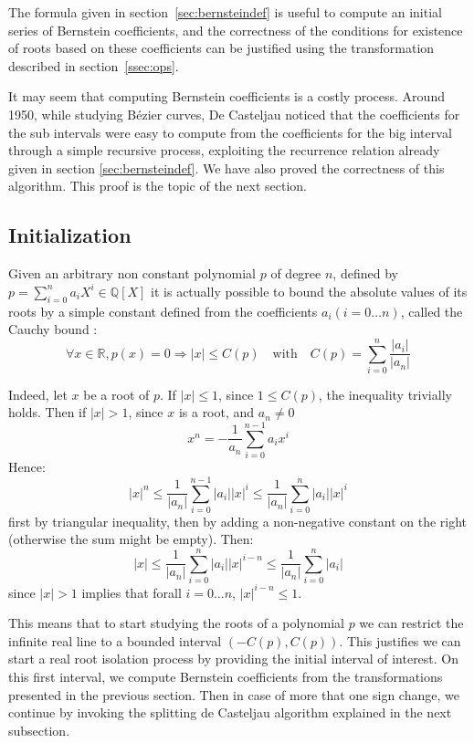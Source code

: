 \documentclass{mscs}
\begin{document}
The formula given in section~\ref{sec:bernsteindef} is useful to compute an
initial series of Bernstein coefficients, and the correctness of the
conditions for existence of roots based on these coefficients can be
justified using the transformation described in
section~\ref{ssec:ops}.

It may seem that computing Bernstein coefficients is a costly process.
Around 1950, while studying B\'ezier curves, De Casteljau noticed that
the coefficients for the sub intervals
were easy to compute from the coefficients for the big interval
through a simple recursive process, exploiting the recurrence relation
already given in section \ref{sec:bernsteindef}. We have also proved the
correctness of this algorithm. This proof is the topic of the next
section.

\subsection{Initialization}\label{ssec:cauchy}
Given an arbitrary non constant polynomial $p$ of degree
$n$, defined by $p = \sum_{i  = 0}^n a_iX^i \in
\mathbb{Q}[X]$ it is actually  possible to bound the absolute values
of its roots by a simple constant defined from the coefficients
$a_i ({i = 0 \dots n})$, called the Cauchy bound \cite{bpr}:
$$\forall x \in \mathbb{R}, p(x) = 0 \Rightarrow |x|
\leq C(p) \quad \textrm{with} \quad C(p) = \sum_{i=0}^n \frac{|a_i|}{|a_n|}$$

Indeed, let $x$ be a root of $p$. If $|x|\leq 1$, since $1 \leq C(p)$,
the inequality trivially holds. Then if $|x| > 1$, since $x$ is a root,
and $a_n \neq 0$
$$x^n = - \frac{1}{a_n}\sum_{i = 0}^{n-1}a_i x^i$$
Hence:
$$|x|^n \leq \frac{1}{|a_n|}\sum_{i = 0}^{n-1}|a_i| |x|^i \leq
\frac{1}{|a_n|}\sum_{i = 0}^{n}|a_i| |x|^i$$
first by triangular inequality, then by adding a non-negative constant
on the right (otherwise the sum might be empty). Then:
$$|x| \leq \frac{1}{|a_n|}\sum_{i = 0}^{n}|a_i| |x|^{i - n} \leq
\frac{1}{|a_n|}\sum_{i = 0}^{n}|a_i| $$
since $|x| > 1$ implies that forall $i = 0 \dots n$,
$|x|^{i - n} \leq 1$.

This means that to start studying the roots of a polynomial $p$ we can
restrict the infinite real line to a bounded interval
$(- C(p), C(p))$. This justifies we can start a real root isolation
process by providing the initial interval of interest. On this first
interval, we compute Bernstein coefficients from the transformations
presented in the previous section. Then in case of more that one sign
change, we continue by invoking the splitting de Casteljau algorithm
explained in the next subsection.
\end{document}
